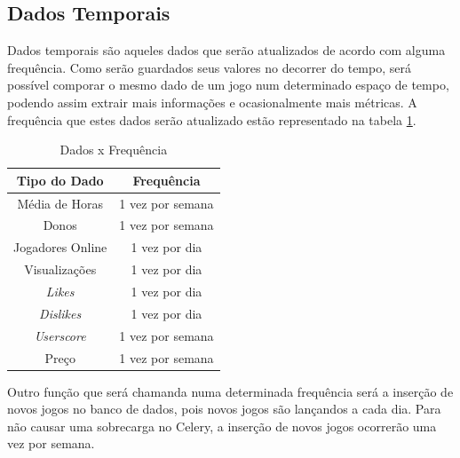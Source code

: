\subsection{Dados Temporais}
Dados temporais são aqueles dados que serão atualizados de acordo com alguma frequência. Como serão guardados seus valores no decorrer do tempo, será possível comporar o mesmo dado de um jogo num determinado espaço de tempo, podendo assim extrair mais informações e ocasionalmente mais métricas. A frequência que estes dados serão atualizado estão representado na tabela \ref{table:frequencia}.
\begin{table} [H]
\centering
\begin{tabular} {c|c}
\textbf{Tipo do Dado}&\textbf{Frequência} \\
\hline Média de Horas&1 vez por semana \\
\hline Donos&1 vez por semana \\
\hline Jogadores Online&1 vez por dia \\
\hline Visualizações&1 vez por dia \\
\hline \textit{Likes}&1 vez por dia \\
\hline \textit{Dislikes}&1 vez por dia \\
\hline \textit{Userscore}&1 vez por semana \\
\hline Preço&1 vez por semana \\
\hline 
\end{tabular}
\caption{Dados x Frequência}
\label{table:frequencia}
\end{table}

Outro função que será chamanda numa determinada frequência será a inserção de novos jogos no banco de dados, pois novos jogos são lançandos a cada dia. Para não causar uma sobrecarga no Celery, a inserção de novos jogos ocorrerão uma vez por semana.


